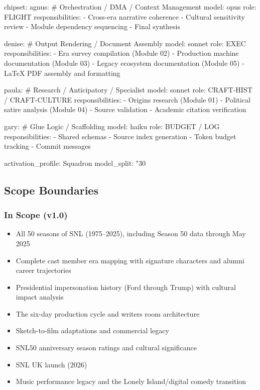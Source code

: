 \documentclass[11pt,letterpaper]{article}
\begin{document}
\begin{asciibox}
chipset:
  agnus:          # Orchestration / DMA / Context Management
    model: opus
    role: FLIGHT
    responsibilities:
      - Cross-era narrative coherence
      - Cultural sensitivity review
      - Module dependency sequencing
      - Final synthesis

  denise:         # Output Rendering / Document Assembly
    model: sonnet
    role: EXEC
    responsibilities:
      - Era survey compilation (Module 02)
      - Production machine documentation (Module 03)
      - Legacy ecosystem documentation (Module 05)
      - LaTeX PDF assembly and formatting

  paula:          # Research / Anticipatory / Specialist
    model: sonnet
    role: CRAFT-HIST / CRAFT-CULTURE
    responsibilities:
      - Origins research (Module 01)
      - Political satire analysis (Module 04)
      - Source validation
      - Academic citation verification

  gary:           # Glue Logic / Scaffolding
    model: haiku
    role: BUDGET / LOG
    responsibilities:
      - Shared schemas
      - Source index generation
      - Token budget tracking
      - Commit messages

activation_profile: Squadron
model_split: "30%
\end{asciibox}

\subsection{Scope Boundaries}

\subsubsection{In Scope (v1.0)}
\begin{itemize}[noitemsep]
  \item All 50 seasons of SNL (1975--2025), including Season 50 data through May 2025
  \item Complete cast member era mapping with signature characters and alumni career trajectories
  \item Presidential impersonation history (Ford through Trump) with cultural impact analysis
  \item The six-day production cycle and writers room architecture
  \item Sketch-to-film adaptations and commercial legacy
  \item SNL50 anniversary season ratings and cultural significance
  \item SNL UK launch (2026)
  \item Music performance legacy and the Lonely Island/digital comedy transition
\end{itemize}
\end{document}

